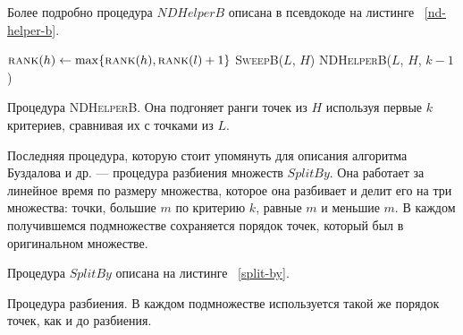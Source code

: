 Более подробно процедура $NDHelperB$ описана в псевдокоде на листинге ~\ref{nd-helper-b}.

\begin{algorithm}
\begin{algorithmic}[1]
     \Return
                \State $\textsc{rank}(h) \gets \max\{\textsc{rank}(h), \textsc{rank}(l) + 1\}$
            \EndIf
        \EndFor
        \State \textsc{SweepB}($L$, $H$)
        \State \textsc{NDHelperB}($L$, $H$, $k - 1$)
    \EndIf
\EndProcedure
\end{algorithmic}
\caption{Процедура \textsc{NDHelperB}. Она подгоняет ранги точек из $H$
         используя первые $k$ критериев, сравнивая их с точками из $L$.}
\label{nd-helper-b}
\end{algorithm}

Последняя процедура, которую стоит упомянуть для описания алгоритма Буздалова и др. {---} процедура разбиения множеств $SplitBy$. Она работает за линейное время по размеру множества, которое она разбивает и делит его на три множества: точки, большие $m$ по критерию $k$, равные $m$ и меньшие $m$. В каждом получившемся подмножестве сохраняется порядок точек, который был в оригинальном множестве.

Процедура $SplitBy$ описана на листинге ~\ref{split-by}.

\begin{algorithm}
\begin{algorithmic}[1]
\EndProcedure
\end{algorithmic}
\caption{Процедура разбиения. В каждом подмножестве используется такой же
         порядок точек, как и до разбиения.}
\label{split-by}
\end{algorithm}

